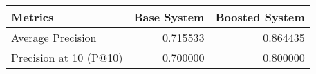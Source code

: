 \begin{tabular}{lrr}
\toprule
Metrics & Base System & Boosted System \\
\midrule
Average Precision & 0.715533 & 0.864435 \\
Precision at 10 (P@10) & 0.700000 & 0.800000 \\
\bottomrule
\end{tabular}
